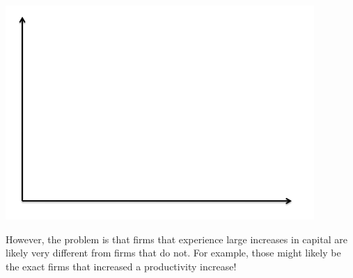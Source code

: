 \documentclass[12pt,english]{article}
\begin{document}
\begin{center}
	\begin{adjustbox}{
			max width=0.65\textwidth,
		}
		\includegraphics{axes.png}
	\end{adjustbox}
\end{center}

However, the problem is that firms that experience large increases in capital are likely very different from firms that do not. For example, those might likely be the exact firms that increased a productivity increase!
\end{document}
